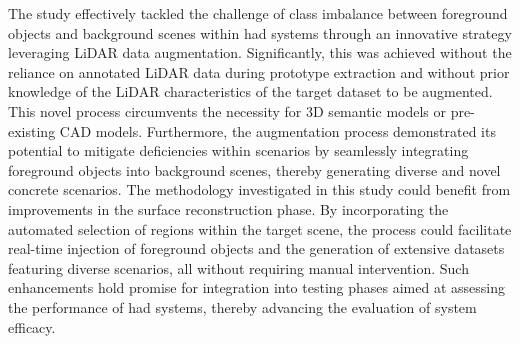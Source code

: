 The study effectively tackled the challenge of class imbalance between foreground objects and background scenes within \acrfull{had} systems through an innovative strategy leveraging LiDAR data augmentation. Significantly, this was achieved without the reliance on annotated LiDAR data during prototype extraction and without prior knowledge of the LiDAR characteristics of the target dataset to be augmented. This novel process circumvents the necessity for 3D semantic models or pre-existing CAD models. Furthermore, the augmentation process demonstrated its potential to mitigate deficiencies within scenarios by seamlessly integrating foreground objects into background scenes, thereby generating diverse and novel concrete scenarios. 
The methodology investigated in this study could benefit from improvements in the surface reconstruction phase. By incorporating the automated selection of regions within the target scene, the process could facilitate real-time injection of foreground objects and the generation of extensive datasets featuring diverse scenarios, all without requiring manual intervention. Such enhancements hold promise for integration into testing phases aimed at assessing the performance of \acrfull{had} systems, thereby advancing the evaluation of system efficacy.

